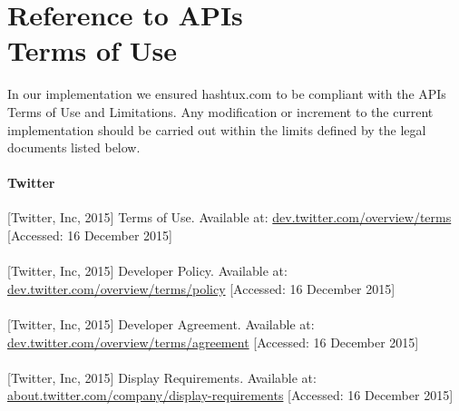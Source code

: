 \label{appendix}
\appendix

\hypertarget{refapis}{
\chapter[Reference to APIs Terms of Use]{Reference to APIs\\ Terms of Use}}
In our implementation we ensured hashtux.com to be compliant with the APIs Terms
of Use and Limitations. Any modification or increment to the current
implementation should be carried out within the limits defined by the legal
documents listed below.

\subsubsection{Twitter}
{[Twitter, Inc, 2015]} Terms of Use. \newline
Available at: \href{https://dev.twitter.com/overview/terms}
   {dev.twitter.com/overview/terms} \newline
{[Accessed: 16 December 2015]} \\ \\
{[Twitter, Inc, 2015]} Developer Policy. \newline
Available at: \href{https://dev.twitter.com/overview/terms/policy}
   {dev.twitter.com/overview/terms/policy} \newline
{[Accessed: 16 December 2015]} \\ \\
{[Twitter, Inc, 2015]} Developer Agreement. \newline
Available at: \href{https://dev.twitter.com/overview/terms/agreement}
   {dev.twitter.com/overview/terms/agreement} \newline
{[Accessed: 16 December 2015]} \\ \\
{[Twitter, Inc, 2015]} Display Requirements. \newline
Available at: \href{https://about.twitter.com/company/display-requirements}
   {about.twitter.com/company/display-requirements} \newline
{[Accessed: 16 December 2015]}

